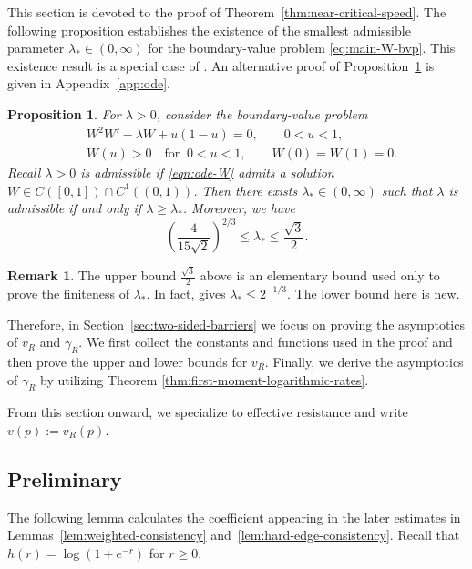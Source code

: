 \documentclass[12pt,preprint]{amsart}
\numberwithin{equation}{section}
\theoremstyle{plain}
\newtheorem{proposition}[theorem]{Proposition}
\theoremstyle{definition}
\newtheorem{remark}[theorem]{Remark}
\begin{document}
This section is devoted to the proof of
Theorem~\ref{thm:near-critical-speed}. The following proposition establishes
the existence of the smallest admissible parameter
$\lambda_*\in(0,\infty)$ for the boundary-value problem
\eqref{eq:main-W-bvp}. This existence result is a special case of
\cite[Proposition~2]{EnguicaGavioliSanchez2013}. An alternative proof of
Proposition~\ref{prop:Cstar-halfline} is given in Appendix~\ref{app:ode}.
\begin{proposition}
\label{prop:Cstar-halfline}
For $\lambda>0$, consider the boundary-value problem
\begin{equation}\label{eqn:ode-W}
\begin{aligned}
 &W^2W'-\lambda W+u(1-u)=0,\qquad 0<u<1,\\
 &W(u)>0\quad\text{for }\ 0<u<1, \qquad
 W(0)=W(1)=0.
\end{aligned}
\end{equation}
Recall $\lambda>0$ is \emph{admissible} if \eqref{eqn:ode-W} admits a solution
$W\in C([0,1])\cap C^1((0,1))$.
Then there exists $\lambda_*\in(0,\infty)$ such that $\lambda$ is admissible
if and only if $\lambda\ge\lambda_*$. Moreover, we have
\begin{equation}\label{eq:Z-halfline}
    \left(\frac{4}{15\sqrt2}\right)^{2/3} \le \lambda_* \le \frac{\sqrt{3}}{2}.
\end{equation}
\end{proposition}
\begin{remark}
  The upper bound $\frac{\sqrt3}{2}$ above is an elementary bound used only to prove the finiteness of $\lambda_*$. In fact, \cite[Proposition~2]{EnguicaGavioliSanchez2013} gives $\lambda_*\le 2^{-1/3}$. The lower bound here is new.
\end{remark}
Therefore, in Section~\ref{sec:two-sided-barriers} we focus on proving the asymptotics of $v_R$ and $\gamma_R$.
We first collect the constants and
functions used in the proof and then prove the upper and lower bounds for $v_R$.
Finally, we derive the asymptotics of $\gamma_R$ by utilizing Theorem \ref{thm:first-moment-logarithmic-rates}.

From this section onward, we specialize to effective resistance and write
$v(p):=v_R(p)$.

\subsection{Preliminary}

The following lemma calculates the coefficient appearing in the later
estimates in Lemmas~\ref{lem:weighted-consistency}
and~\ref{lem:hard-edge-consistency}.
Recall that \(h(r)=\log(1+e^{-r})\) for \(r\ge0\).
\end{document}
